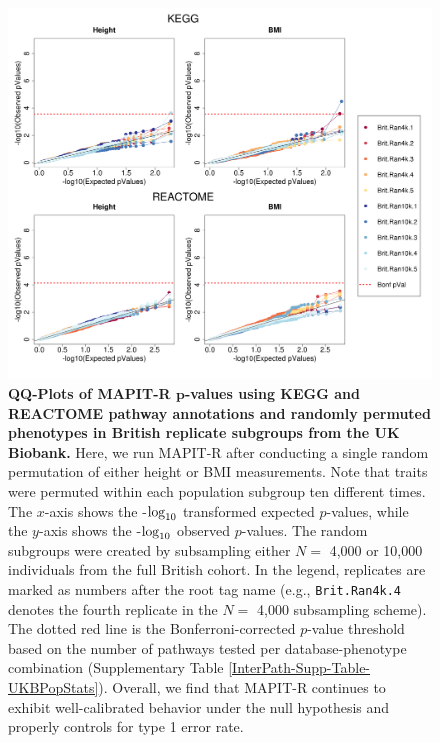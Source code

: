 \documentclass[10pt]{article}
\def\log{{\rm log}}
\begin{document}
\begin{figure}[htbp]
\centering
\includegraphics[width=\textwidth]{Images/Supp/InterPath_Supp_Figure_BritReps_perm1_QQPlots_AllPaths_vs1.png}
\caption{\textbf{QQ-Plots of MAPIT-R $\bm{p}$-values using KEGG and REACTOME pathway annotations and randomly permuted phenotypes in British replicate subgroups from the UK Biobank.} Here, we run MAPIT-R after conducting a single random permutation of either height or BMI measurements. Note that traits were permuted within each population subgroup ten different times. The $x$-axis shows the -$\log_{10}$ transformed expected $p$-values, while the $y$-axis shows the -$\log_{10}$ observed $p$-values. The random subgroups were created by subsampling either $N =$ 4,000 or 10,000 individuals from the full British cohort. In the legend, replicates are marked as numbers after the root tag name (e.g., \texttt{Brit.Ran4k.4} denotes the fourth replicate in the $N =$ 4,000 subsampling scheme). The dotted red line is the Bonferroni-corrected $p$-value threshold based on the number of pathways tested per database-phenotype combination (Supplementary Table \ref{InterPath-Supp-Table-UKBPopStats}). Overall, we find that MAPIT-R continues to exhibit well-calibrated behavior under the null hypothesis and properly controls for type 1 error rate.}
\label{InterPath-Supp-Figure-BritReps-perm1-QQPlots-AllPaths}
\end{figure}
\clearpage

\end{document}
